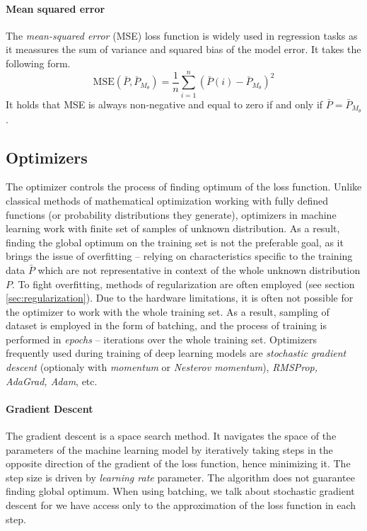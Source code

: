 \paragraph{Mean squared error}
The \emph{mean-squared error} (MSE) loss function is widely used in regression tasks as it meassures the sum of variance and squared bias of the model error. It takes the following form.
\begin{equation} \label{eqn:mse}
\text{MSE}\left(\bar{P}, \bar{P}_{M_\theta}\right) = \frac{1}{n} \sum\limits_{i=1}^{n} \left(\bar{P}(i) - \bar{P}_{M_\theta}\right)^2
\end{equation}
It holds that MSE is always non-negative and equal to zero if and only if $\bar{P} = \bar{P}_{M_\theta}$.

\subsection{Optimizers}
\label{sec:optimizers}

The optimizer controls the process of finding optimum of the loss function. Unlike classical methods of mathematical optimization working with fully defined functions (or probability distributions they generate), optimizers in machine learning work with finite set of samples of unknown distribution. As a result, finding the global optimum on the training set is not the preferable goal, as it brings the issue of overfitting -- relying on characteristics specific to the training data $\bar{P}$ which are not representative in context of the whole unknown distribution $P$. To fight overfitting, methods of regularization are often employed (see section \ref{sec:regularization}). Due to the hardware limitations, it is often not possible for the optimizer to work with the whole training set. As a result, sampling of dataset is employed in the form of batching, and the process of training is performed in \emph{epochs} -- iterations over the whole training set. Optimizers frequently used during training of deep learning models are \emph{stochastic gradient descent} (optionaly with \emph{momentum} or \emph{Nesterov momentum}), \emph{RMSProp, AdaGrad, Adam}, etc.

\paragraph{Gradient Descent}

The gradient descent is a space search method. It navigates the space of the parameters of the machine learning model by iteratively taking steps in the opposite direction of the gradient of the loss function, hence minimizing it. The step size is driven by \emph{learning rate} parameter. The algorithm does not guarantee finding global optimum. When using batching, we talk about stochastic gradient descent for we have access only to the approximation of the loss function in each step.

